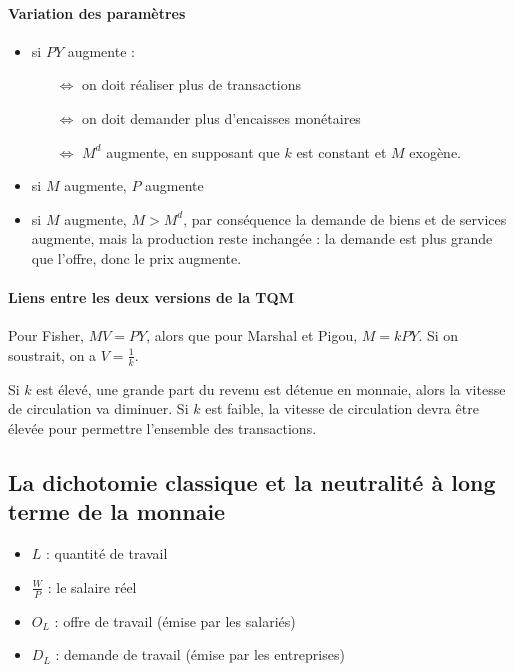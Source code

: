 	\paragraph{Variation des paramètres}
	
	\begin{itemize}
		\item si $PY$ augmente :
		
		\begin{itemize}
			\item[$\Leftrightarrow$] on doit réaliser plus de transactions
			\item[$\Leftrightarrow$] on doit demander plus d'encaisses monétaires
			\item[$\Leftrightarrow$] $M^d$ augmente, en supposant que $k$ est constant et $M$ exogène.
		\end{itemize}
		
		\item si $M$ augmente, $P$ augmente
		\item si $M$ augmente, $M > M^d$, par conséquence la demande de biens et de services augmente, mais la production reste inchangée : la demande est plus grande que l'offre, donc le prix augmente.
	\end{itemize}
	
	\paragraph{Liens entre les deux versions de la TQM}
	
	Pour Fisher, $MV = PY$, alors que pour Marshal et Pigou, $M = kPY$. Si on soustrait, on a $V = \frac{1}{k}$.
	
	Si $k$ est élevé, une grande part du revenu est détenue en monnaie, alors la vitesse de circulation va diminuer. Si $k$ est faible, la  vitesse de circulation devra être élevée pour permettre l'ensemble des transactions.
	
	\subsection{La dichotomie classique et la neutralité à long terme de la monnaie}
	
	
	\begin{itemize}
		\item $L$ : quantité de travail
		\item $\frac{W}{P}$ : le salaire réel
		\item $O_L$ : offre de travail (émise par les salariés)
		\item $D_L$ : demande de travail (émise par les entreprises)
	\end{itemize}
	
